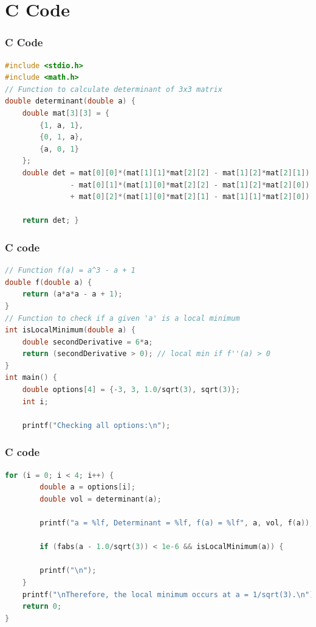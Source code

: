 \documentclass{beamer}
\theoremstyle{remark}
\numberwithin{equation}{section}
\begin{document}
\section{C Code}
\begin{frame}[fragile]
\frametitle{C Code}
\begin{lstlisting}[language=C]
#include <stdio.h>
#include <math.h>
// Function to calculate determinant of 3x3 matrix
double determinant(double a) {
    double mat[3][3] = {
        {1, a, 1},
        {0, 1, a},
        {a, 0, 1}
    };
    double det = mat[0][0]*(mat[1][1]*mat[2][2] - mat[1][2]*mat[2][1])
               - mat[0][1]*(mat[1][0]*mat[2][2] - mat[1][2]*mat[2][0])
               + mat[0][2]*(mat[1][0]*mat[2][1] - mat[1][1]*mat[2][0]);

    return det; }
    \end{lstlisting}
\end{frame}
\begin{frame}[fragile]
    \frametitle{C code}
    \begin{lstlisting}[language=C]
// Function f(a) = a^3 - a + 1
double f(double a) {
    return (a*a*a - a + 1);
}
// Function to check if a given 'a' is a local minimum
int isLocalMinimum(double a) {
    double secondDerivative = 6*a;
    return (secondDerivative > 0); // local min if f''(a) > 0
}
int main() {
    double options[4] = {-3, 3, 1.0/sqrt(3), sqrt(3)};
    int i;

    printf("Checking all options:\n");
    \end{lstlisting}
\end{frame}
\begin{frame}[fragile]
    \frametitle{C code}
    \begin{lstlisting}[language=C]
  for (i = 0; i < 4; i++) {
        double a = options[i];
        double vol = determinant(a);

        printf("a = %lf, Determinant = %lf, f(a) = %lf", a, vol, f(a));

        if (fabs(a - 1.0/sqrt(3)) < 1e-6 && isLocalMinimum(a)) {
        
        printf("\n");
    }
    printf("\nTherefore, the local minimum occurs at a = 1/sqrt(3).\n");
    return 0;
}
     \end{lstlisting}
\end{frame}
\end{document}
